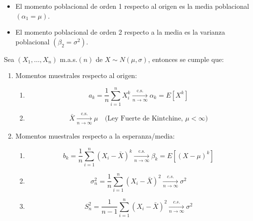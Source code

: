 \begin{observación}
\vspace{-\topsep} %
\vspace{-\topsep} %
\vspace{-\topsep} %
\begin{itemize}
	\item El momento poblacional de orden 1 respecto al origen es la media poblacional
	      $(\alpha_1 = \mu)$.
	\item El momento poblacional de orden 2 respecto a la media es la varianza
	      poblacional $(\beta_2 = \sigma^2)$.
\end{itemize}
\end{observación}

\begin{proposición}
Sea $\left(X_{1}, \ldots, X_{n}\right)$ m.a.s.$(n)$ de $X \sim N(\mu, \sigma)$, entonces se cumple que:
\begin{enumerate}
	\item Momentos muestrales respecto al origen:
	      \begin{enumerate}
		      \item $$    a_{k}=\frac{1}{n} \sum_{i=1}^{n} X_{i}^{k} \xrightarrow[n \rightarrow \infty]{\text{c.s.}} \alpha_{k}=E\left[X^{k}\right]$$
		      \item $$     \bar{X} \xrightarrow[n \rightarrow \infty]{\text{c.s.}} \mu \quad \text{(Ley Fuerte de Kintchine, } \mu<\infty \text{)}$$
	      \end{enumerate}
	\item Momentos muestrales respecto a la esperanza/media:
	      \begin{enumerate}
		      \item  $$b_{k}=\frac{1}{n} \sum_{i=1}^{n}\left(X_{i}-\bar{X}\right)^{k} \xrightarrow[n \rightarrow \infty]{\text{c.s.}} \beta_{k}=E\left[(X-\mu)^{k}\right]$$
		      \item $$ \sigma_n^2 = \frac{1}{n}\sum_{i = 1}^{n}(X_i - \bar{X})^2 \underset{n \to \infty}{\xrightarrow{c.s.}} \sigma^2 $$
		      \item $$ S_n^2 = \frac{1}{n-1}\sum_{i = 1}^{n}(X_i - \bar{X})^2\underset{n \to \infty}{\xrightarrow{c.s.}} \sigma^2 $$
	      \end{enumerate}
\end{enumerate}
\end{proposición}


